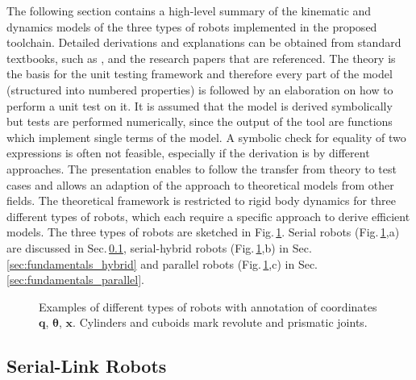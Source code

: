 \documentclass[runningheads]{llncs}
\begin{document}
The following section contains a high-level summary of the kinematic and dynamics models of the three types of robots implemented in the proposed toolchain.
Detailed derivations and explanations can be obtained from standard textbooks, such as \cite{Merlet2006,KhalilDom2002,BriotKha2015,SaminFis2013}, and the research papers that are referenced.
The theory is the basis for the unit testing framework and therefore every part of the model (structured into numbered properties) is followed by an elaboration on how to perform a unit test on it.
It is assumed that the model is derived symbolically but tests are performed numerically, since the output of the tool are functions which implement single terms of the model.
A symbolic check for equality of two expressions is often not feasible, especially if the derivation is by different approaches.
The presentation enables to follow the transfer from theory to test cases and allows an adaption of the approach to theoretical models from other fields.
The theoretical framework is restricted to rigid body dynamics for three different types of robots, which each require a specific approach to derive efficient models.
The three types of robots are sketched in Fig.\,\ref{fig:robot_examples}.
Serial robots (Fig.\,\ref{fig:robot_examples},a) are discussed in Sec.\,\ref{sec:fundamentals_serial}, serial-hybrid robots (Fig.\,\ref{fig:robot_examples},b) in Sec.\,\ref{sec:fundamentals_hybrid} and parallel robots (Fig.\,\ref{fig:robot_examples},c) in Sec.\,\ref{sec:fundamentals_parallel}.

\begin{figure}[tb]

\caption{Examples of different types of robots with annotation of coordinates $\bm{q}$, $\bm{\theta}$,  $\bm{x}$. Cylinders and cuboids mark revolute and prismatic joints.} %
\label{fig:robot_examples}
\end{figure} 

\subsection{Serial-Link Robots}
\label{sec:fundamentals_serial}
\end{document}
